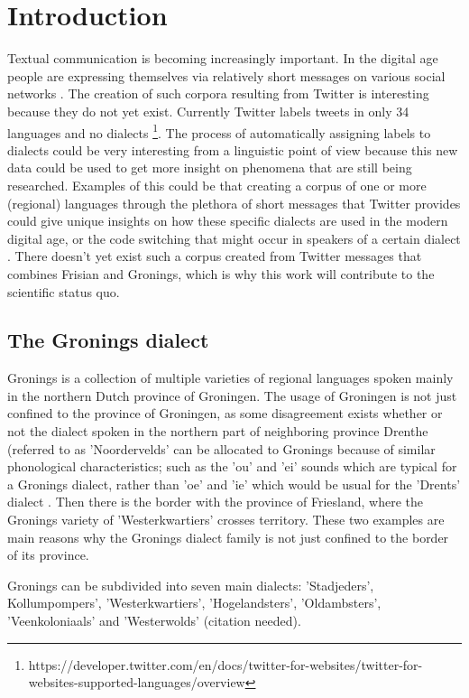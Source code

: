 \documentclass[
10pt, %
a4paper, %
oneside, %
headinclude,footinclude, %
] {book}%
\begin{document}
\chapter{Introduction}

Textual communication is becoming increasingly important. In the digital age people are expressing themselves via relatively short messages on various social networks \citep{Hughes}. The creation of such corpora resulting from Twitter is interesting because they do not yet exist. 
Currently Twitter labels tweets in only 34 languages and no dialects \footnote{https://developer.twitter.com/en/docs/twitter-for-websites/twitter-for-websites-supported-languages/overview}. The process of automatically assigning labels to dialects could be very interesting from a linguistic point of view because this new data could be used to get more insight on phenomena that are still being researched. Examples of this could be that creating a corpus of one or more (regional) languages through the plethora of short messages that Twitter provides could give unique insights on how these specific dialects are used in the modern digital age, or the code switching that might occur in speakers of a certain dialect \citep{Biadsy}. There doesn't yet exist such a corpus created from Twitter messages that combines Frisian and Gronings, which is why this work will contribute to the scientific status quo.

\section{The Gronings dialect}
Gronings is a collection of multiple varieties of regional languages spoken mainly in the northern Dutch province of Groningen. The usage of Groningen is not just confined to the province of Groningen, as some disagreement exists whether or not the dialect spoken in the northern part of neighboring province Drenthe (referred to as 'Noordervelds' can be allocated to Gronings because of similar phonological characteristics; such as the 'ou' and 'ei' sounds which are typical for a Gronings dialect, rather than 'oe' and 'ie' which would be usual for the 'Drents' dialect \citep{streektalen}. Then there is the border with the province of Friesland, where the Gronings variety of 'Westerkwartiers' crosses territory. These two examples are main reasons why the Gronings dialect family is not just confined to the border of its province.

Gronings can be subdivided into seven main dialects: 'Stadjeders', Kollumpompers', 'Westerkwartiers', 'Hogelandsters', 'Oldambsters', 'Veenkoloniaals' and 'Westerwolds' (citation needed). 
\end{document}
